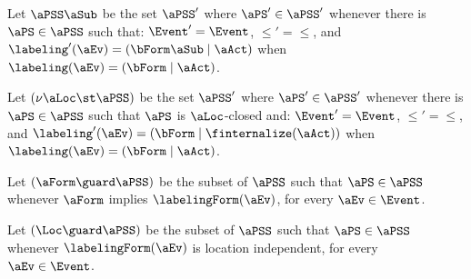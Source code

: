 \begin{definition}
  Let $\aPSS\aSub$ be the set $\aPSS'$ where $\aPS'\in\aPSS'$ whenever
there is $\aPS\in\aPSS$ such that:
$\Event' = \Event$,
${\le'} = {\le}$, 
and
$\labeling'(\aEv) = (\bForm\aSub \mid \aAct)$ when $\labeling(\aEv) = (\bForm \mid \aAct)$.


Let $(\nu\aLoc\st\aPSS)$ be the set $\aPSS'$ where $\aPS'\in\aPSS'$ whenever
there is $\aPS\in\aPSS$ such that $\aPS$ is $\aLoc$-closed and:
$\Event' = \Event$,
${\le'} = {\le}$, 
and
$\labeling'(\aEv) = (\bForm \mid \finternalize(\aAct))$ when $\labeling(\aEv) = (\bForm \mid \aAct)$.

Let $(\aForm \guard \aPSS)$ be the subset of $\aPSS$ such that $\aPS\in\aPSS$ whenever
$\aForm$ implies $\labelingForm(\aEv)$, for every $\aEv\in\Event$. %

Let $(\Loc\guard \aPSS)$ be the subset of $\aPSS$ such that
$\aPS\in\aPSS$ whenever $\labelingForm(\aEv)$ is location independent, for every $\aEv\in\Event$.
%
\end{definition}




